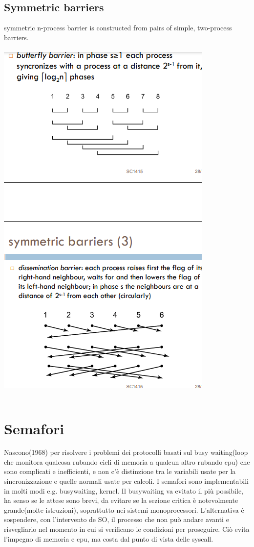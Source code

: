 \documentclass[10pt,a4paper]{article}
\begin{document}
\subsection{Symmetric barriers}
symmetric n-process barrier is constructed from pairs of simple, two-process barriers.\\ \\ 
\includegraphics[scale=0.7]{img/butterfly.png} \\ \\

\section{Semafori}
Nascono(1968) per risolvere i problemi dei protocolli basati sul busy waiting(loop che monitora qualcosa rubando cicli di memoria a qualcun altro rubando cpu) che sono complicati e inefficienti, e non c'è distinzione tra le variabili usate per la sincronizzazione e quelle normali usate per calcoli.
I semafori sono implementabili in molti modi e.g. busywaiting, kernel.
Il busywaiting va evitato il più possibile, ha senso se le attese sono brevi, da evitare se la sezione critica è notevolmente grande(molte istruzioni), soprattutto nei sistemi monoprocessori.
L'alternativa è sospendere, con l'intervento de SO, il processo che non può andare avanti e risvegliarlo nel momento in cui si verificano le condizioni per proseguire. Ciò evita l'impegno di memoria e cpu, ma costa dal punto di vista delle syscall.
\end{document}
